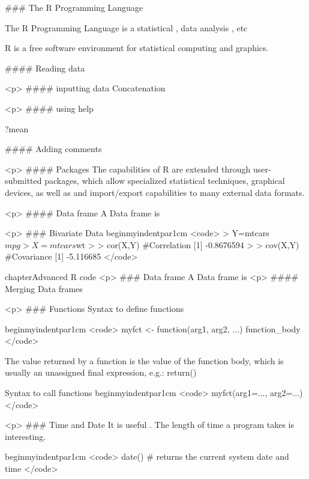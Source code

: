
### {The R Programming Language}

The R Programming Language is a statistical , data analysis , etc

R is a free software environment for statistical computing and graphics.




#### {Reading data}


<p>
#### {inputting data}
 Concatenation

<p>
#### {using help}

?mean

#### {Adding comments}

<p>
#### {Packages}
The capabilities of R are extended through user-submitted packages, which allow specialized statistical techniques, graphical devices, as well as and
import/export capabilities to many external data formats.


<p>
#### {Data frame}
A Data frame is





<p>
### {Bivariate Data}
 begin{myindentpar}{1cm}
<code>
> Y=mtcars$mpg
> X=mtcars$wt
>
> cor(X,Y)   #Correlation
[1] -0.8676594
>
> cov(X,Y)   #Covariance
[1] -5.116685
</code>






chapter{Advanced R code}
<p>
### {Data frame}
A Data frame is
<p>
#### {Merging Data frames}

<p>
### {Functions}
Syntax to define functions

begin{myindentpar}{1cm}
<code>
 myfct <- function(arg1, arg2, ...) { function_body }
</code>

The value returned by a function is the value of the function body, which is usually an unassigned final expression, e.g.: return()

Syntax to call functions
begin{myindentpar}{1cm}
<code>
 myfct(arg1=..., arg2=...)
</code>



<p>
### {Time and Date}
It is useful . The length of time a program takes is interesting.


begin{myindentpar}{1cm}
<code>
date() # returns the current system date and time
</code>




